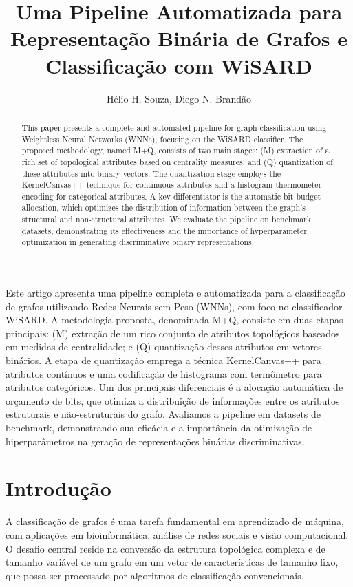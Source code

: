 \documentclass[12pt]{article}
\title{Uma Pipeline Automatizada para Representação Binária de Grafos e Classificação com WiSARD}
\author{Hélio H. Souza\inst{1}, Diego N. Brandão\inst{2}}
\begin{document}
 

\maketitle

\begin{abstract}
This paper presents a complete and automated pipeline for graph classification using Weightless Neural Networks (WNNs), focusing on the WiSARD classifier. The proposed methodology, named M+Q, consists of two main stages: (M) extraction of a rich set of topological attributes based on centrality measures; and (Q) quantization of these attributes into binary vectors. The quantization stage employs the KernelCanvas++ technique for continuous attributes and a histogram-thermometer encoding for categorical attributes. A key differentiator is the automatic bit-budget allocation, which optimizes the distribution of information between the graph's structural and non-structural attributes. We evaluate the pipeline on benchmark datasets, demonstrating its effectiveness and the importance of hyperparameter optimization in generating discriminative binary representations.
\end{abstract}
     
\begin{resumo} 
Este artigo apresenta uma pipeline completa e automatizada para a classificação de grafos utilizando Redes Neurais sem Peso (WNNs), com foco no classificador WiSARD. A metodologia proposta, denominada M+Q, consiste em duas etapas principais: (M) extração de um rico conjunto de atributos topológicos baseados em medidas de centralidade; e (Q) quantização desses atributos em vetores binários. A etapa de quantização emprega a técnica KernelCanvas++ para atributos contínuos e uma codificação de histograma com termômetro para atributos categóricos. Um dos principais diferenciais é a alocação automática de orçamento de bits, que otimiza a distribuição de informações entre os atributos estruturais e não-estruturais do grafo. Avaliamos a pipeline em datasets de benchmark, demonstrando sua eficácia e a importância da otimização de hiperparâmetros na geração de representações binárias discriminativas.
\end{resumo}


\section{Introdução}

A classificação de grafos é uma tarefa fundamental em aprendizado de máquina, com aplicações em bioinformática, análise de redes sociais e visão computacional. O desafio central reside na conversão da estrutura topológica complexa e de tamanho variável de um grafo em um vetor de características de tamanho fixo, que possa ser processado por algoritmos de classificação convencionais.
\end{document}
